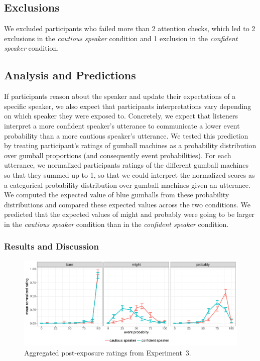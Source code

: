 \documentclass[man, floatsintext]{apa6}
\begin{document}
\subsection{Exclusions}

We excluded participants who failed more than 2 attention checks, which led to 2 exclusions in the \emph{cautious speaker} condition and 1 exclusion in the \emph{confident speaker} condition.


\subsection{Analysis and Predictions}

If participants reason about the speaker and update their expectations of a specific speaker, we also expect that participants interpretations 
vary depending on which speaker they were exposed to. Concretely, we expect that listeners interpret a more confident speaker's utterance 
to communicate a lower event probability than a more cautious speaker's utterance. We tested this prediction by treating participant's ratings 
of gumball machines as a probability distribution over gumball proportions (and consequently event probabilities).  For each utterance, we 
normalized participants ratings of the different gumball machines so that they summed up to 1, so that we could interpret the normalized scores 
as a categorical probability distribution over gumball machines given an utterance. We computed the expected value of blue gumballs from these probability distributions and compared these expected values across the two conditions. We predicted that the expected values of {\sc might} and {\sc probably} were going to be larger in the \emph{cautious speaker} condition than in the \emph{confident speaker} condition.

\subsubsection{Results and Discussion}

\begin{figure}[h!]
\includegraphics[width=\textwidth]{plots/exp-2-ratings.pdf}
\caption{Aggregated post-exposure ratings from Experiment~3.  \label{fig:adaptation-results-comp-orig}}
\end{figure}
\end{document}
